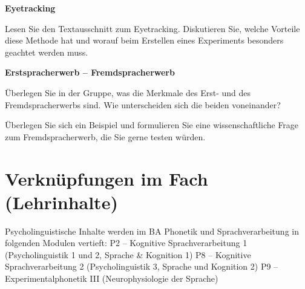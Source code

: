 \documentclass[11pt]{book}
\begin{document}
\vspace{1cm}

\textbf{Eyetracking}

Lesen Sie den Textausschnitt zum Eyetracking. Diskutieren Sie, welche Vorteile diese Methode hat und worauf beim Erstellen eines Experiments besonders geachtet werden muss.


\vspace{1cm}

\textbf{Erstspracherwerb – Fremdspracherwerb}

Überlegen Sie in der Gruppe, was die Merkmale des Erst- und des Fremdspracherwerbs sind. Wie unterscheiden sich die beiden voneinander?

Überlegen Sie sich ein Beispiel und formulieren Sie eine wissenschaftliche Frage zum Fremdspracherwerb, die Sie gerne testen würden.





\section{Verknüpfungen im Fach (Lehrinhalte)}
Psycholinguistische Inhalte werden im BA Phonetik und Sprachverarbeitung in folgenden Modulen vertieft:
P2 – Kognitive Sprachverarbeitung 1 (Psycholinguistik 1 und 2, Sprache \& Kognition 1)
P8 – Kognitive Sprachverarbeitung 2 (Psycholinguistik 3, Sprache und Kognition 2)
P9 – Experimentalphonetik III (Neurophysiologie der Sprache)
\end{document}
